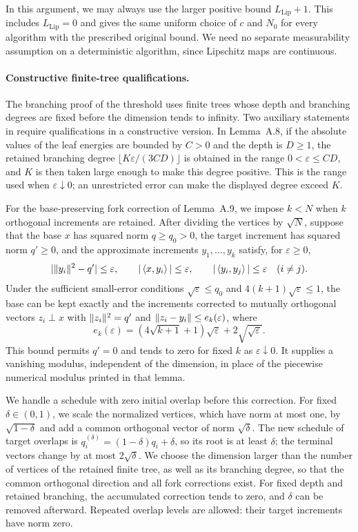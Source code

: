 In this argument, we may always use the larger positive bound
$L_{\mathrm{Lip}}+1$. This includes
$L_{\mathrm{Lip}}=0$ and gives the same uniform choice of $c$ and $N_0$
for every algorithm with the prescribed original bound. We need no separate
measurability assumption on a deterministic algorithm, since Lipschitz maps
are continuous.

\paragraph{Constructive finite-tree qualifications.}
The branching proof of the threshold uses finite trees whose depth and
branching degrees are fixed before the dimension tends to infinity. Two
auxiliary statements in \cite[Appendix~A]{hs2023} require qualifications
in a constructive version. In Lemma~A.8, if the absolute values of the leaf
energies are bounded by $C>0$ and the depth is $D\ge1$, the retained branching
degree $\lfloor K\varepsilon/(3CD)\rfloor$ is obtained in the range
$0<\varepsilon\le CD$, and $K$ is then taken large enough to make this
degree positive. This is the range used when $\varepsilon\downarrow0$;
an unrestricted error can make the displayed degree exceed $K$.

For the base-preserving fork correction of Lemma~A.9, we impose $k<N$
when $k$ orthogonal increments are retained. After dividing
the vertices by $\sqrt N$, suppose that the base $x$ has squared norm
$q\ge q_0>0$, the target increment has squared norm $q'\ge0$, and the
approximate increments $y_1,\dots,y_k$ satisfy, for $\varepsilon\ge0$,
\[
 |\lVert y_i\rVert^2-q'|\le\varepsilon,\qquad
 |\left\langle x,y_i\right\rangle|\le\varepsilon,\qquad
 |\left\langle y_i,y_j\right\rangle|\le\varepsilon\quad(i\ne j).
\]
Under the sufficient small-error conditions
$\sqrt\varepsilon\le q_0$ and $4(k+1)\sqrt\varepsilon\le1$, the base can
be kept exactly and the increments corrected to mutually orthogonal
vectors $z_i\perp x$ with $\lVert z_i\rVert^2=q'$ and
$\lVert z_i-y_i\rVert\le e_k(\varepsilon)$, where
\[
 e_k(\varepsilon)
 =(4\sqrt{k+1}+1)\sqrt\varepsilon
   +2\sqrt{\sqrt\varepsilon}.
\]
This bound permits $q'=0$ and tends to zero for fixed $k$ as
$\varepsilon\downarrow0$. It supplies a vanishing modulus, independent of the dimension, in place of
the piecewise numerical modulus printed in that lemma.

We handle a schedule with zero initial overlap before this correction.
For fixed $\delta\in(0,1)$, we scale the normalized vertices, which have norm
at most one, by $\sqrt{1-\delta}$ and add a common orthogonal vector of norm
$\sqrt\delta$. The new schedule of target overlaps is
$q_i^{(\delta)}=(1-\delta)q_i+\delta$, so its root is at least $\delta$;
the terminal vectors change by at most $2\sqrt\delta$. We choose the dimension larger than the number of vertices of the retained
finite tree, as well as its branching degree, so that the common orthogonal
direction and all fork corrections exist. For fixed depth and retained
branching, the accumulated correction tends to zero, and $\delta$ can be
removed afterward. Repeated overlap levels are allowed: their target
increments have norm zero.

